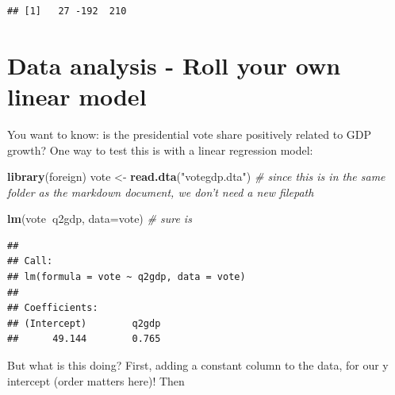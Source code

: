 \documentclass[]{article}
\newenvironment{Shaded}{\begin{snugshade}}{\end{snugshade}}
\newcommand{\KeywordTok}[1]{\textcolor[rgb]{0.13,0.29,0.53}{\textbf{#1}}}
\newcommand{\DataTypeTok}[1]{\textcolor[rgb]{0.13,0.29,0.53}{#1}}
\newcommand{\DecValTok}[1]{\textcolor[rgb]{0.00,0.00,0.81}{#1}}
\newcommand{\StringTok}[1]{\textcolor[rgb]{0.31,0.60,0.02}{#1}}
\newcommand{\CommentTok}[1]{\textcolor[rgb]{0.56,0.35,0.01}{\textit{#1}}}
\newcommand{\OperatorTok}[1]{\textcolor[rgb]{0.81,0.36,0.00}{\textbf{#1}}}
\newcommand{\NormalTok}[1]{#1}
\begin{document}
\begin{verbatim}
## [1]   27 -192  210
\end{verbatim}

\clearpage

\section{Data analysis - Roll your own linear
model}\label{data-analysis---roll-your-own-linear-model}

You want to know: is the presidential vote share positively related to
GDP growth? One way to test this is with a linear regression model:

\begin{Shaded}
\begin{Highlighting}[]
\KeywordTok{library}\NormalTok{(foreign)}
\NormalTok{vote <-}\StringTok{ }\KeywordTok{read.dta}\NormalTok{(}\StringTok{"votegdp.dta"}\NormalTok{) }\CommentTok{# since this is in the same folder as the markdown document, we don't need a new filepath}

\KeywordTok{lm}\NormalTok{(vote}\OperatorTok{~}\NormalTok{q2gdp, }\DataTypeTok{data=}\NormalTok{vote) }\CommentTok{# sure is}
\end{Highlighting}
\end{Shaded}

\begin{verbatim}
## 
## Call:
## lm(formula = vote ~ q2gdp, data = vote)
## 
## Coefficients:
## (Intercept)        q2gdp  
##      49.144        0.765
\end{verbatim}

\begin{Shaded}
\end{Shaded}

But what is this doing? First, adding a constant column to the data, for
our y intercept (order matters here)! Then

\begin{Shaded}
\end{Shaded}
\end{document}
